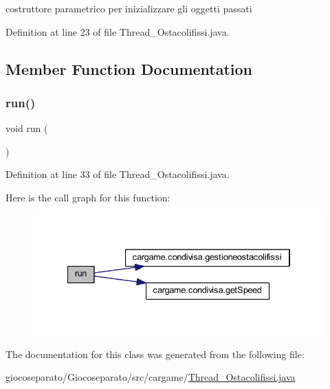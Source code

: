 costruttore parametrico per inizializzare gli oggetti passati 



Definition at line 23 of file Thread\+\_\+\+Ostacolifissi.\+java.



\subsection{Member Function Documentation}
\mbox{\label{classcargame_1_1_thread___ostacolifissi_a13a43e6d814de94978c515cb084873b1}} 
\subsubsection{\texorpdfstring{run()}{run()}}
{\footnotesize\ttfamily void run (\begin{DoxyParamCaption}{ }\end{DoxyParamCaption})}



Definition at line 33 of file Thread\+\_\+\+Ostacolifissi.\+java.

Here is the call graph for this function\+:
\nopagebreak
\begin{figure}[H]
\begin{center}
\leavevmode
\includegraphics[width=334pt]{classcargame_1_1_thread___ostacolifissi_a13a43e6d814de94978c515cb084873b1_cgraph}
\end{center}
\end{figure}


The documentation for this class was generated from the following file\+:\begin{DoxyCompactItemize}
\item 
giocoseparato/\+Giocoseparato/src/cargame/\hyperlink{_thread___ostacolifissi_8java}{Thread\+\_\+\+Ostacolifissi.\+java}\end{DoxyCompactItemize}
